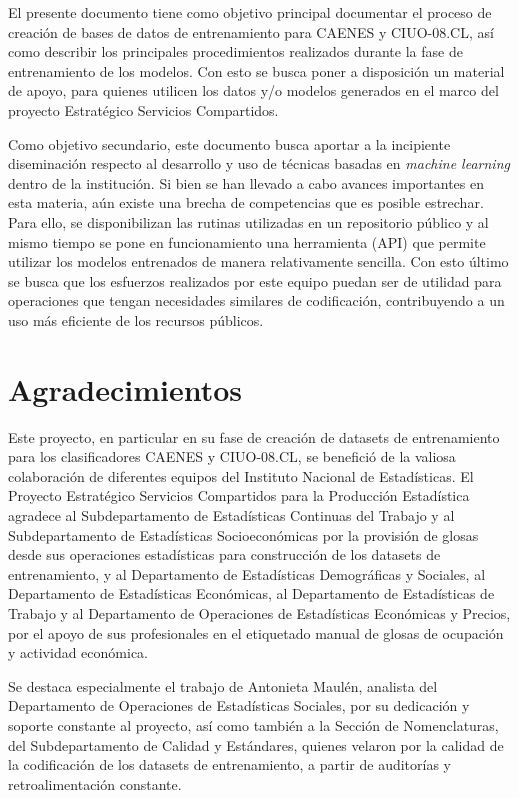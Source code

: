 \documentclass[
  12pt,
  spanish,
]{article}
\begin{document}
El presente documento tiene como objetivo principal documentar el
proceso de creación de bases de datos de entrenamiento para CAENES y
CIUO-08.CL, así como describir los principales procedimientos realizados
durante la fase de entrenamiento de los modelos. Con esto se busca poner
a disposición un material de apoyo, para quienes utilicen los datos y/o
modelos generados en el marco del proyecto Estratégico Servicios
Compartidos.

Como objetivo secundario, este documento busca aportar a la incipiente
diseminación respecto al desarrollo y uso de técnicas basadas en
\emph{machine learning} dentro de la institución. Si bien se han llevado
a cabo avances importantes en esta materia, aún existe una brecha de
competencias que es posible estrechar. Para ello, se disponibilizan las
rutinas utilizadas en un repositorio público y al mismo tiempo se pone
en funcionamiento una herramienta (API) que permite utilizar los modelos
entrenados de manera relativamente sencilla. Con esto último se busca
que los esfuerzos realizados por este equipo puedan ser de utilidad para
operaciones que tengan necesidades similares de codificación,
contribuyendo a un uso más eficiente de los recursos públicos.

\newpage

\hypertarget{agradecimientos}{%
\section{Agradecimientos}\label{agradecimientos}}

Este proyecto, en particular en su fase de creación de datasets de
entrenamiento para los clasificadores CAENES y CIUO-08.CL, se benefició
de la valiosa colaboración de diferentes equipos del Instituto Nacional
de Estadísticas. El Proyecto Estratégico Servicios Compartidos para la
Producción Estadística agradece al Subdepartamento de Estadísticas
Continuas del Trabajo y al Subdepartamento de Estadísticas
Socioeconómicas por la provisión de glosas desde sus operaciones
estadísticas para construcción de los datasets de entrenamiento, y al
Departamento de Estadísticas Demográficas y Sociales, al Departamento de
Estadísticas Económicas, al Departamento de Estadísticas de Trabajo y al
Departamento de Operaciones de Estadísticas Económicas y Precios, por el
apoyo de sus profesionales en el etiquetado manual de glosas de
ocupación y actividad económica.

Se destaca especialmente el trabajo de Antonieta Maulén, analista del
Departamento de Operaciones de Estadísticas Sociales, por su dedicación
y soporte constante al proyecto, así como también a la Sección de
Nomenclaturas, del Subdepartamento de Calidad y Estándares, quienes
velaron por la calidad de la codificación de los datasets de
entrenamiento, a partir de auditorías y retroalimentación constante.
\end{document}
